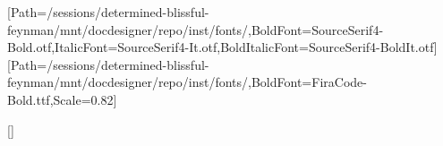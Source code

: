 \usepackage{fontspec}
\usepackage{anyfontsize}
\setmainfont{SourceSerif4-Regular.otf}[Path=/sessions/determined-blissful-feynman/mnt/docdesigner/repo/inst/fonts/,BoldFont=SourceSerif4-Bold.otf,ItalicFont=SourceSerif4-It.otf,BoldItalicFont=SourceSerif4-BoldIt.otf]
\setmonofont{FiraCode-Regular.ttf}[Path=/sessions/determined-blissful-feynman/mnt/docdesigner/repo/inst/fonts/,BoldFont=FiraCode-Bold.ttf,Scale=0.82]
\usepackage{xcolor}
\color{text}
\usepackage[explicit]{titlesec}
[\vspace{2pt}{\color{rule}\titlerule[1pt]}]
\titlespacing*{\section}{0pt}{1.7em}{0.5em}
\titlespacing*{\subsection}{0pt}{1.1em}{0.3em}
\titlespacing*{\subsubsection}{0pt}{0.9em}{0.2em}
\usepackage{titling}
\pretitle{\begin{flushleft}\fontsize{26.0}{28.6}\selectfont\bfseries\color{accent}}
\posttitle{\par\end{flushleft}\vskip0.3em{\color{rule}\rule{\linewidth}{2pt}}\vskip0.4em}
\preauthor{\begin{flushleft}\large\color{muted}}
\postauthor{\end{flushleft}}
\predate{\begin{flushleft}\color{muted}}
\postdate{\end{flushleft}}
\usepackage{microtype}
\usepackage{booktabs}
\renewcommand{\arraystretch}{1.2}
\setlength{\parindent}{0pt}
\setlength{\parskip}{0.5em}
\linespread{1.3}
\usepackage{fancyhdr}\pagestyle{fancy}\fancyhf{}
\renewcommand{\headrulewidth}{0pt}\renewcommand{\footrulewidth}{0.4pt}
\fancyfoot[R]{\small\color{muted}\thepage}